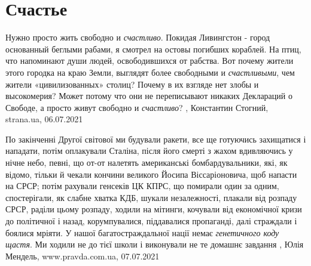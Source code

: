  
 
 
 
 
\chapter{Счастье}

Нужно просто жить свободно и \emph{счастливо}.  Покидая Ливингстон - город основанный
беглыми рабами, я смотрел на остовы погибших кораблей. На птиц, что напоминают
души людей, освободившихся от рабства.  Вот почему жители этого городка на краю
Земли, выглядят более свободными и \emph{счастливыми}, чем жители «цивилизованных»
столиц? Почему в их взгляде нет злобы и высокомерия? Может потому что они не
переписывают никаких Деклараций о Свободе, а просто живут свободно и \emph{счастливо}?
, 
Константин Стогний, strana.ua, 06.07.2021


По закінченні Другої світової ми будували ракети, все ще готуючись захищатися і
нападати, потім оплакували Сталіна, після його смерті з жахом вдивляючись у
нічне небо, певні, що от-от налетять американські бомбардувальники, які, як
відомо, тільки й чекали кончини великого Йосипа Віссаріоновича, щоб напасти на
СРСР; потім рахували генсеків ЦК КПРС, що помирали один за одним, спостерігали,
як слабне хватка КДБ, шукали незалежності, плакали від розпаду СРСР, раділи
цьому розпаду, ходили на мітинги, кочували від економічної кризи до політичної
і назад, корумпувалися, піддавалися пропаганді, далі страждали і боялися
мріяти.  У нашої багатостраждальної нації немає \emph{генетичного коду щастя}.
Ми ходили не до тієї школи і виконували не те домашнє завдання
, 
Юлія Мендель, www.pravda.com.ua, 07.07.2021

